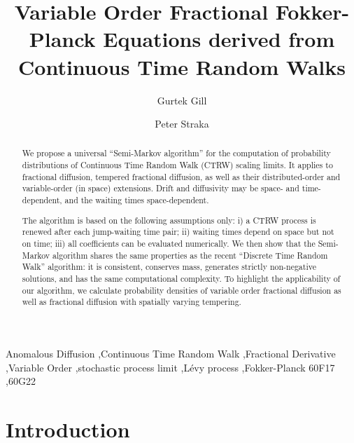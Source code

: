 \documentclass[a4paper,12pt]{elsarticle}
\numberwithin{equation}{section}
\theoremstyle{plain}
\theoremstyle{definition}
\theoremstyle{remark}
\numberwithin{equation}{section}
\newcommand{\1}{\mathbf 1}
\begin{document}
\begin{frontmatter}

\title{Variable Order Fractional Fokker-Planck Equations derived from 
Continuous Time Random Walks}
\author[UNSW]{Gurtek Gill}
\author[UNSW]{Peter Straka}
\address[UNSW]{School of Mathematics \& Statistics, UNSW Sydney}

\begin{abstract}
We propose a universal ``Semi-Markov algorithm'' for the computation of probability distributions of Continuous Time Random Walk (CTRW) scaling limits.  It applies to fractional diffusion, tempered fractional diffusion, as well as their distributed-order and variable-order (in space) extensions.  Drift and diffusivity may be space- and time-dependent, and the waiting times space-dependent.  

The algorithm is based on the following assumptions only: i) a CTRW process is renewed after each jump-waiting time pair; ii) waiting times depend on space but not on time; iii) all coefficients can be evaluated numerically.  We then show that the Semi-Markov algorithm shares the same properties as the recent ``Discrete Time Random Walk'' algorithm: it is consistent, conserves mass, generates strictly non-negative solutions, and has the same computational complexity.  To highlight the applicability of our algorithm, we calculate probability densities of variable order fractional diffusion as well as fractional diffusion with spatially varying tempering.
\end{abstract}

\begin{keyword}
Anomalous Diffusion \sep Continuous Time Random Walk \sep Fractional Derivative \sep Variable Order \sep stochastic process limit \sep L\'evy process \sep Fokker-Planck
\MSC[2010] 60F17 \sep  60G22
\end{keyword}

\end{frontmatter}

\section{Introduction}
\end{document}
